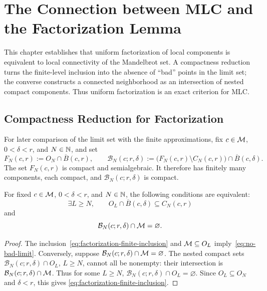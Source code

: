 \chapter{The Connection between MLC and the Factorization Lemma}
\noindent This chapter establishes that uniform factorization of local components is equivalent to local connectivity of the Mandelbrot set. A compactness reduction turns the finite-level inclusion into the absence of “bad” points in the limit set; the converse constructs a connected neighborhood as an intersection of nested compact components. Thus uniform factorization is an exact criterion for MLC.

\section{Compactness Reduction for Factorization}
\label{sec:factorization-compactness-reduction}

For later comparison of the limit set with the finite approximations,
fix \(c\in\mathcal M\), \(0<\delta<r\), and \(N\in\mathbb N\), and set
\begin{equation}
 \label{eq:factorization-local-data}
 F_N(c,r):=O_N\cap\overline B(c,r),\qquad
 \mathcal B_N(c;r,\delta):=
 \bigl(F_N(c,r)\setminus C_N(c,r)\bigr)\cap\overline B(c,\delta).
\end{equation}
The set \(F_N(c,r)\) is compact and semialgebraic. It therefore has
finitely many components, each compact, and
\(\mathcal B_N(c;r,\delta)\) is compact.

\begin{proposition}
\label{prop:factorization-compactness-reduction}
For fixed \(c\in\mathcal M\), \(0<\delta<r\), and \(N\in\mathbb N\), the following
conditions are equivalent:
\begin{equation}
 \label{eq:factorization-finite-inclusion}
 \exists L\ge N,\qquad
 O_L\cap\overline B(c,\delta)\subseteq C_N(c,r)
\end{equation}
and
\begin{equation}
 \label{eq:no-bad-limit}
 \mathcal B_N(c;r,\delta)\cap\mathcal M=\varnothing.
\end{equation}
\end{proposition}
\begin{proof}
The inclusion~\eqref{eq:factorization-finite-inclusion} and
\(\mathcal M\subseteq O_L\) imply~\eqref{eq:no-bad-limit}. Conversely, suppose
\(\mathcal B_N(c;r,\delta)\cap\mathcal M=\varnothing\). The nested compact sets
\(\mathcal B_N(c;r,\delta)\cap O_L\), \(L\ge N\), cannot all be
nonempty: their intersection is
\(\mathcal B_N(c;r,\delta)\cap\mathcal M\). Thus for some \(L\ge N\),
\(\mathcal B_N(c;r,\delta)\cap O_L=\varnothing\). Since
\(O_L\subseteq O_N\) and \(\delta<r\), this gives
\eqref{eq:factorization-finite-inclusion}.
\end{proof}

